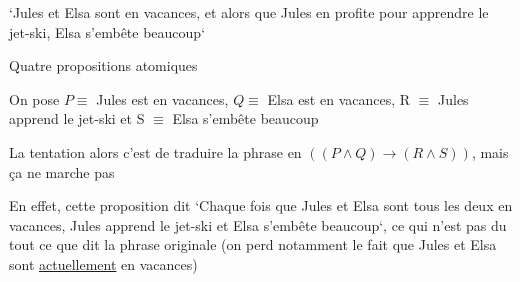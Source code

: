 %
%
%
%



\begin{frame}

`Jules et Elsa sont en vacances, et alors que Jules en profite pour apprendre le jet-ski, Elsa
s'embête beaucoup`\pause\newline

Quatre propositions atomiques\pause\newline

On pose $P \equiv $ Jules est en vacances, $Q \equiv $ Elsa est en vacances, R $\equiv$ Jules apprend le jet-ski et S $\equiv$ Elsa s'embête beaucoup\pause\newline 

La tentation alors c'est de traduire la phrase en $((P \wedge Q) \rightarrow (R \wedge S))$, mais ça ne marche pas\pause\newline

En effet, cette proposition dit `Chaque fois que Jules et Elsa sont tous les deux en vacances, Jules apprend le jet-ski et Elsa s'embête beaucoup`, ce qui n'est pas du tout ce que dit la phrase originale (on perd notamment le fait que Jules et Elsa sont \underline{actuellement} en vacances)

\end{frame}

